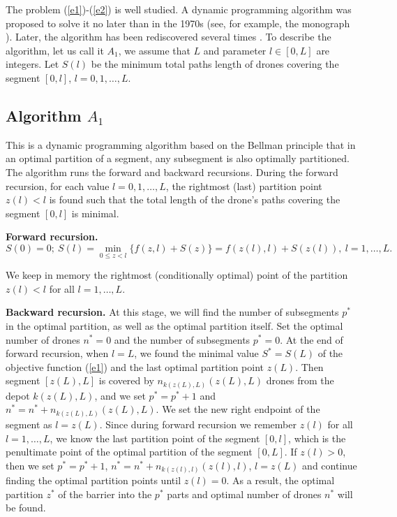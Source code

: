 \documentclass[runningheads]{llncs}
\begin{document}
The problem (\ref{e1})-(\ref{e2}) is well studied. A dynamic programming algorithm was proposed to solve it no later than in the 1970s (see, for example, the monograph \cite{Beresnev:78}). Later, the algorithm has been rediscovered several times \cite{Jackson05,Tilli:19,Vidal:93}. To describe the algorithm, let us call it $A_1$, we assume that $L$ and parameter $l\in [0,L]$ are integers. Let $S(l)$ be the minimum total paths length of drones covering the segment $[0,l]$, $l=0,1,\ldots,L$.

\subsection{Algorithm $A_1$}
This is a dynamic programming algorithm based on the Bellman principle that in an optimal partition of a segment, any subsegment is also optimally partitioned. The algorithm runs the forward and backward recursions. During the forward recursion, for each value $l=0,1,\ldots,L$, the rightmost (last) partition point $z(l)<l$ is found such that the total length of the drone’s paths covering the segment $[0,l]$ is minimal.

\textbf{Forward recursion.}
\begin{equation}\label{e3}
  S(0)=0;\ S(l)=\min\limits_{0\leq z< l} \{f(z,l)+S(z)\}=f(z(l),l)+S(z(l)),\ l=1,\ldots,L.
\end{equation}

We keep in memory the rightmost (conditionally optimal) point of the partition $z(l)<l$ for all $l=1,\ldots,L$.

\textbf{Backward recursion.} At this stage, we will find the number of subsegments $p^*$ in the optimal partition, as well as the optimal partition itself. Set the optimal number of drones $n^*=0$ and the number of subsegments $p^*=0$. At the end of forward recursion, when $l=L$, we found the minimal value $S^*=S(L)$ of the objective function (\ref{e1}) and the last optimal partition point $z(L)$. Then segment $[z(L),L]$ is covered by $n_{k(z(L),L)}(z(L),L)$ drones from the depot $k(z(L),L)$, and we set $p^*=p^*+1$ and $n^*=n^*+n_{k(z(L),L)}(z(L),L)$. We set the new right endpoint of the segment as $l=z(L)$. Since during forward recursion we remember $z(l)$ for all $l=1,\ldots,L$, we know the last partition point of the segment $[0,l]$, which is the penultimate point of the optimal partition of the segment $[0,L]$. If $z(l)>0$, then we set $p^*=p^*+1$, $n^*=n^*+n_{k(z(l),l)}(z(l),l)$, $l=z(L)$ and continue finding the optimal partition points until $z(l)=0$. As a result, the optimal partition $z^*$ of the barrier into the $p^*$ parts and optimal number of drones $n^*$ will be found.
\end{document}
